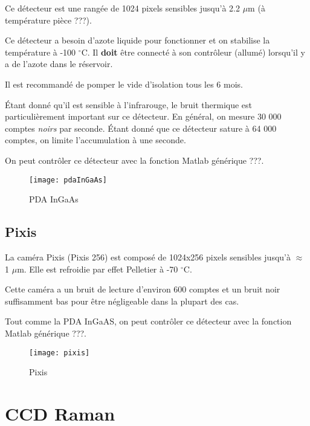 \documentclass[11pt,francais]{book} %
\begin{document}
Ce détecteur est une rangée de 1024 pixels sensibles jusqu'à 2.2 $\mu$m (à température pièce ???).

Ce détecteur a besoin d'azote liquide pour fonctionner et on stabilise la température à -100 $^{\circ}$C.
Il {\bf doit} être connecté à son contrôleur (allumé) lorsqu'il y a de l'azote dans le réservoir.

Il est recommandé de pomper le vide d'isolation tous les 6 mois.

Étant donné qu'il est sensible à l'infrarouge, le bruit thermique est particulièrement important sur ce détecteur.
En général, on mesure 30 000 comptes {\it noirs} par seconde.
Étant donné que ce détecteur sature à 64 000 comptes, on limite l'accumulation à une seconde.

On peut contrôler ce détecteur avec la fonction Matlab générique ???.

\begin{figure}[h]
  \centering\texttt{[image: pdaInGaAs]}
  \caption{PDA InGaAs}
  \label{fig:pdaingaas}
\end{figure}

\subsection{Pixis}

La caméra Pixis (Pixis 256) est composé de 1024x256 pixels sensibles jusqu'à $\approx$ 1 $\mu$m.
Elle est refroidie par effet Pelletier à -70 $^{\circ}$C.

Cette caméra a un bruit de lecture d'environ 600 comptes et un bruit noir suffisamment bas pour être négligeable dans la plupart des cas.

Tout comme la PDA InGaAS, on peut contrôler ce détecteur avec la fonction Matlab générique ???.

\begin{figure}[h]
  \centering\texttt{[image: pixis]}
  \caption{Pixis}
  \label{fig:pixis}
\end{figure}



\section{CCD Raman}
\end{document}

